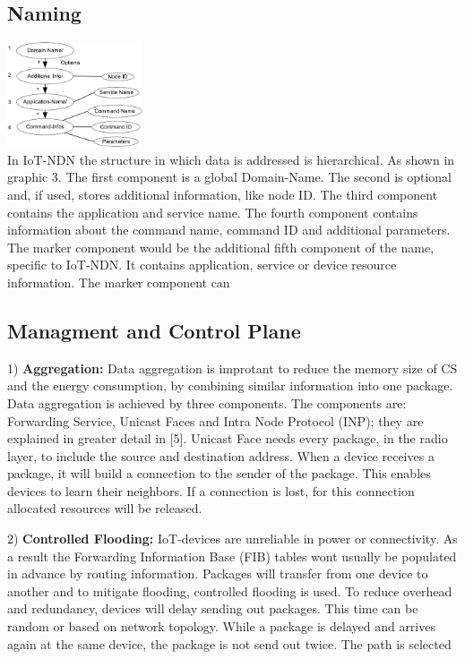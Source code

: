 \documentclass[conference]{IEEEtran}
\begin{document}
\subsection{Naming}
\includegraphics[width=0.3\textwidth]{Name_Structure_of_the_suggested_Approach.png}\\
In IoT-NDN the structure in which data is addressed is hierarchical. As shown in graphic 3. 
The first component is a global Domain-Name. 
The second is optional and, if used, stores additional information, like node ID.
The third component contains the application and service name.
The fourth component contains information about the command name, command ID and additional parameters.
The marker component would be the additional fifth component of the name, specific to IoT-NDN.
It contains application, service or device resource information.
The marker component can 

\subsection{Managment and Control Plane}
1) \textbf{Aggregation:} Data aggregation is improtant to reduce the memory size of CS and the energy consumption, by combining similar information into one package. Data aggregation is achieved by three components. The components are: Forwarding Service, Unicast Faces and Intra Node Protocol (INP); they are explained in greater detail in [5]. 
Unicast Face needs every package, in the radio layer, to include the source and destination address. 
When a device receives a package, it will build a connection to the sender of the package. 
This enables devices to learn their neighbors. %
If a connection is lost, for this connection allocated resources will be released. 

2) \textbf{Controlled Flooding:}
IoT-devices are unreliable in power or connectivity. %
As a result the Forwarding Information Base (FIB) tables wont usually be populated in advance by routing information. %
Packages will transfer from one device to another and to mitigate flooding, controlled flooding is used.
To reduce overhead and redundancy, devices will delay sending out packages. This time can be random or based on network topology.
While a package is delayed and arrives  again at the same device, the package is not send out twice. 
The path is selected
\end{document}
